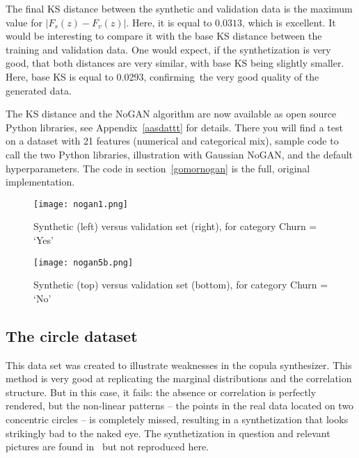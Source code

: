\documentclass[oneside,10pt]{book}
\begin{document}
The final KS distance between the synthetic and validation data is the maximum value for
$|F_s(z) - F_v(z)|$. Here, it is equal to $0.0313$, which is excellent. It would be interesting to compare it with the base KS distance
 between the training and validation data. One would expect, if the synthetization is very good, that both distances are very similar, with base KS
 being slightly smaller. Here, base KS is equal to 0.0293, confirming~the very good quality of the generated data.

The KS distance and the NoGAN algorithm are now available as open source Python libraries, see Appendix~\ref{aasdattt} for details.
There you will find a test on a dataset with 21 features (numerical and categorical mix), sample code to call the two Python libraries,
 illustration with Gaussian NoGAN, and the default hyperparameters.  The code
 in section~\ref{gomornogan} is the full, original implementation.

\begin{figure}[H]
\centering
\texttt{[image: nogan1.png]} %
\caption{Synthetic (left) versus validation set (right), for category Churn = `Yes'}
\label{fig:nogan1}
\end{figure}




\begin{figure}[H]
\centering
\texttt{[image: nogan5b.png]} %
\caption{Synthetic (top) versus validation set (bottom), for category Churn = `No'}
\label{fig:nogan5}
\end{figure}







\subsection{The circle dataset}

This data set was created to illustrate weaknesses in the \textcolor{index}{copula synthesizer}. This method is very good at replicating
 the marginal distributions and the correlation structure. But in this case, it fails: the absence or correlation is perfectly rendered, but
 the non-linear patterns -- the points in the real data located on two concentric circles -- is completely missed, resulting in  a synthetization that looks strikingly bad to the naked eye. The synthetization in question and relevant pictures are found in~\cite{vgvendors} but not reproduced here.
\end{document}
